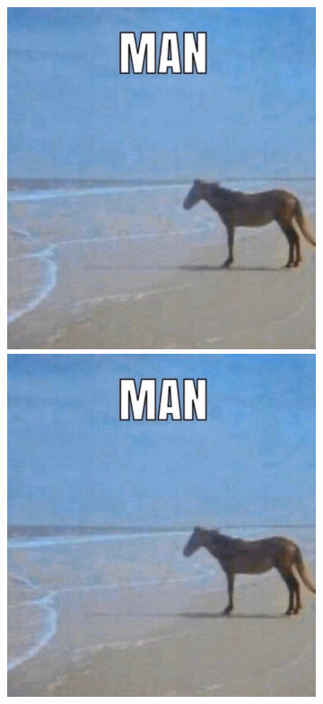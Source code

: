 \documentclass[12pt, fleqn, titlepage]{article}
\newcommand\skipper{1.4pt}
\begin{document}
\begin{figure}[H]
\begin{subfigure}[b]{0.8\textwidth}
		\hskip\skipper
		\includegraphics[width=0.18\linewidth]{imgs/temp_horse}
		\hskip\skipper
		\includegraphics[width=0.18\linewidth]{imgs/temp_horse}
	\end{subfigure}
\end{figure}
\end{document}
